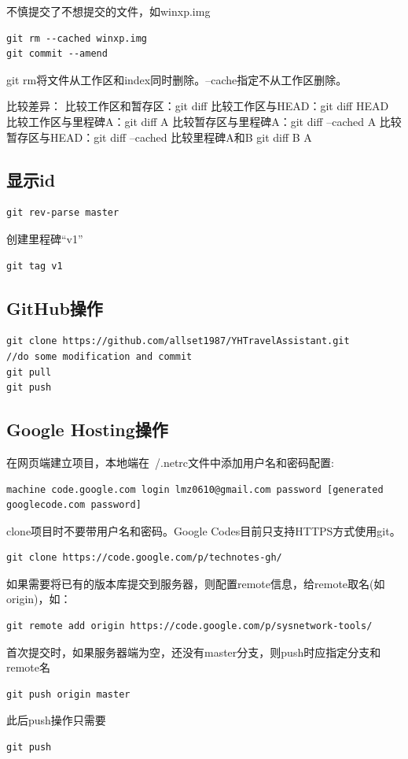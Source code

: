 不慎提交了不想提交的文件，如winxp.img
\begin{verbatim}
git rm --cached winxp.img
git commit --amend
\end{verbatim}
git rm将文件从工作区和index同时删除。--cache指定不从工作区删除。

比较差异：
比较工作区和暂存区：git diff
比较工作区与HEAD：git diff HEAD
比较工作区与里程碑A：git diff A
比较暂存区与里程碑A：git diff --cached A
比较暂存区与HEAD：git diff --cached
比较里程碑A和B git diff B A

\subsection{显示id}
\begin{verbatim}
git rev-parse master
\end{verbatim}

创建里程碑``v1''
\begin{verbatim}
git tag v1
\end{verbatim}

\subsection{GitHub操作}
\begin{verbatim}
git clone https://github.com/allset1987/YHTravelAssistant.git
//do some modification and commit
git pull
git push
\end{verbatim}

\subsection{Google Hosting操作}
在网页端建立项目，本地端在~/.netrc文件中添加用户名和密码配置:
\begin{verbatim}
machine code.google.com login lmz0610@gmail.com password [generated googlecode.com password] 
\end{verbatim}

clone项目时不要带用户名和密码。Google Codes目前只支持HTTPS方式使用git。
\begin{verbatim}
git clone https://code.google.com/p/technotes-gh/
\end{verbatim}

如果需要将已有的版本库提交到服务器，则配置remote信息，给remote取名(如origin)，如：
\begin{verbatim}
git remote add origin https://code.google.com/p/sysnetwork-tools/
\end{verbatim}

首次提交时，如果服务器端为空，还没有master分支，则push时应指定分支和remote名
\begin{verbatim}
git push origin master 
\end{verbatim}
此后push操作只需要
\begin{verbatim}
git push
\end{verbatim}


